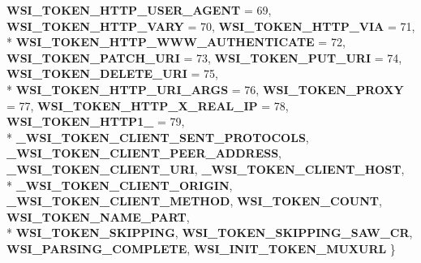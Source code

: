 \begin{DoxyCompactItemize}
{\bfseries W\+S\+I\+\_\+\+T\+O\+K\+E\+N\+\_\+\+H\+T\+T\+P\+\_\+\+U\+S\+E\+R\+\_\+\+A\+G\+E\+NT} = 69, 
{\bfseries W\+S\+I\+\_\+\+T\+O\+K\+E\+N\+\_\+\+H\+T\+T\+P\+\_\+\+V\+A\+RY} = 70, 
{\bfseries W\+S\+I\+\_\+\+T\+O\+K\+E\+N\+\_\+\+H\+T\+T\+P\+\_\+\+V\+IA} = 71, 
\\*
{\bfseries W\+S\+I\+\_\+\+T\+O\+K\+E\+N\+\_\+\+H\+T\+T\+P\+\_\+\+W\+W\+W\+\_\+\+A\+U\+T\+H\+E\+N\+T\+I\+C\+A\+TE} = 72, 
{\bfseries W\+S\+I\+\_\+\+T\+O\+K\+E\+N\+\_\+\+P\+A\+T\+C\+H\+\_\+\+U\+RI} = 73, 
{\bfseries W\+S\+I\+\_\+\+T\+O\+K\+E\+N\+\_\+\+P\+U\+T\+\_\+\+U\+RI} = 74, 
{\bfseries W\+S\+I\+\_\+\+T\+O\+K\+E\+N\+\_\+\+D\+E\+L\+E\+T\+E\+\_\+\+U\+RI} = 75, 
\\*
{\bfseries W\+S\+I\+\_\+\+T\+O\+K\+E\+N\+\_\+\+H\+T\+T\+P\+\_\+\+U\+R\+I\+\_\+\+A\+R\+GS} = 76, 
{\bfseries W\+S\+I\+\_\+\+T\+O\+K\+E\+N\+\_\+\+P\+R\+O\+XY} = 77, 
{\bfseries W\+S\+I\+\_\+\+T\+O\+K\+E\+N\+\_\+\+H\+T\+T\+P\+\_\+\+X\+\_\+\+R\+E\+A\+L\+\_\+\+IP} = 78, 
{\bfseries W\+S\+I\+\_\+\+T\+O\+K\+E\+N\+\_\+\+H\+T\+T\+P1\+\_} = 79, 
\\*
{\bfseries \+\_\+\+W\+S\+I\+\_\+\+T\+O\+K\+E\+N\+\_\+\+C\+L\+I\+E\+N\+T\+\_\+\+S\+E\+N\+T\+\_\+\+P\+R\+O\+T\+O\+C\+O\+LS}, 
{\bfseries \+\_\+\+W\+S\+I\+\_\+\+T\+O\+K\+E\+N\+\_\+\+C\+L\+I\+E\+N\+T\+\_\+\+P\+E\+E\+R\+\_\+\+A\+D\+D\+R\+E\+SS}, 
{\bfseries \+\_\+\+W\+S\+I\+\_\+\+T\+O\+K\+E\+N\+\_\+\+C\+L\+I\+E\+N\+T\+\_\+\+U\+RI}, 
{\bfseries \+\_\+\+W\+S\+I\+\_\+\+T\+O\+K\+E\+N\+\_\+\+C\+L\+I\+E\+N\+T\+\_\+\+H\+O\+ST}, 
\\*
{\bfseries \+\_\+\+W\+S\+I\+\_\+\+T\+O\+K\+E\+N\+\_\+\+C\+L\+I\+E\+N\+T\+\_\+\+O\+R\+I\+G\+IN}, 
{\bfseries \+\_\+\+W\+S\+I\+\_\+\+T\+O\+K\+E\+N\+\_\+\+C\+L\+I\+E\+N\+T\+\_\+\+M\+E\+T\+H\+OD}, 
{\bfseries W\+S\+I\+\_\+\+T\+O\+K\+E\+N\+\_\+\+C\+O\+U\+NT}, 
{\bfseries W\+S\+I\+\_\+\+T\+O\+K\+E\+N\+\_\+\+N\+A\+M\+E\+\_\+\+P\+A\+RT}, 
\\*
{\bfseries W\+S\+I\+\_\+\+T\+O\+K\+E\+N\+\_\+\+S\+K\+I\+P\+P\+I\+NG}, 
{\bfseries W\+S\+I\+\_\+\+T\+O\+K\+E\+N\+\_\+\+S\+K\+I\+P\+P\+I\+N\+G\+\_\+\+S\+A\+W\+\_\+\+CR}, 
{\bfseries W\+S\+I\+\_\+\+P\+A\+R\+S\+I\+N\+G\+\_\+\+C\+O\+M\+P\+L\+E\+TE}, 
{\bfseries W\+S\+I\+\_\+\+I\+N\+I\+T\+\_\+\+T\+O\+K\+E\+N\+\_\+\+M\+U\+X\+U\+RL}
 \}\hypertarget{group__HTTP-headers-read_ga6e747906f9d76532ec118d6ef418b82e}{}\label{group__HTTP-headers-read_ga6e747906f9d76532ec118d6ef418b82e}

\end{DoxyCompactItemize}
